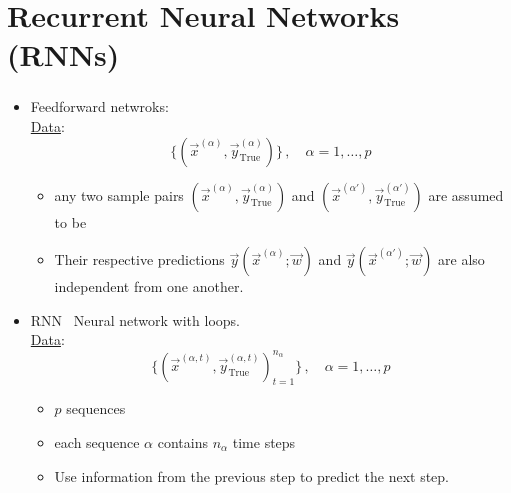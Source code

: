 \section{Recurrent Neural Networks (RNNs)}

\begin{frame}\frametitle{\subsecname}

\begin{itemize}
\item Feedforward netwroks:\\

\underline{Data}:
\begin{equation*}
\Big\{ \left(\vec x^{(\alpha)}, \vec y^{(\alpha)}_{\mathrm{True}} \right) \Big\}\,,\quad \alpha = 1,\ldots,p
\end{equation*}

\pause

\begin{itemize}
\item any two sample pairs $\left(\vec x^{(\alpha)}, \vec y^{(\alpha)}_{\mathrm{True}} \right)$ and $\left(\vec x^{(\alpha')}, \vec y^{(\alpha')}_{\mathrm{True}} \right)$ are assumed to be \iid
\item Their respective predictions $\vec y(\vec x^{(\alpha)}; \vec w)$ and $\vec y(\vec x^{(\alpha')}; \vec w)$ are also independent from one another.
\end{itemize}

\pause

\item RNN \corresponds~Neural network with loops.\\

\underline{Data}:\\

\begin{equation*}
\Big\{ \left(\vec x^{(\alpha,t)}, \vec y^{(\alpha,t)}_{\mathrm{True}} \right)_{t=1}^{n_{\alpha}} \Big\}\,,\quad \alpha = 1,\ldots,p
\end{equation*}

\pause

\begin{itemize}
\item $p$ \iid sequences
\item each sequence $\alpha$ contains $n_{\alpha}$ time steps
\item Use information from the previous step to predict the next step.
\end{itemize}

\end{itemize}

\end{frame}


